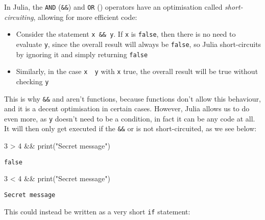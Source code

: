 \documentclass[
  letterpaper,
  DIV=11,
  numbers=noendperiod]{scrreprt}
\newenvironment{Shaded}{\begin{snugshade}}{\end{snugshade}}
\newcommand{\FloatTok}[1]{\textcolor[rgb]{0.68,0.00,0.00}{#1}}
\newcommand{\FunctionTok}[1]{\textcolor[rgb]{0.28,0.35,0.67}{#1}}
\newcommand{\NormalTok}[1]{\textcolor[rgb]{0.00,0.23,0.31}{#1}}
\newcommand{\OperatorTok}[1]{\textcolor[rgb]{0.37,0.37,0.37}{#1}}
\newcommand{\StringTok}[1]{\textcolor[rgb]{0.13,0.47,0.30}{#1}}
\begin{document}
In Julia, the \texttt{AND} (\texttt{\&\&}) and \texttt{OR}
(\texttt{\textbar{}\textbar{}}) operators have an optimisation called
\emph{short-circuiting}, allowing for more efficient code:

\begin{itemize}
\item
  Consider the statement \texttt{x\ \&\&\ y}. If \texttt{x} is
  \texttt{false}, then there is no need to evaluate \texttt{y}, since
  the overall result will always be \texttt{false}, so Julia
  short-circuits by ignoring it and simply returning \texttt{false}
\item
  Similarly, in the case \texttt{x\ \textbar{}\textbar{}\ y} with
  \texttt{x} true, the overall result will be true without checking
  \texttt{y}
\end{itemize}

This is why \texttt{\&\&} and \texttt{\textbar{}\textbar{}} aren't
functions, because functions don't allow this behaviour, and it is a
decent optimisation in certain cases. However, Julia allows us to do
even more, as \texttt{y} doesn't need to be a condition, in fact it can
be any code at all. It will then only get executed if the \texttt{\&\&}
or \texttt{\textbar{}\textbar{}} is not short-circuited, as we see
below:

\begin{Shaded}
\begin{Highlighting}[]
\FloatTok{3} \OperatorTok{\textgreater{}} \FloatTok{4} \OperatorTok{\&\&} \FunctionTok{print}\NormalTok{(}\StringTok{"Secret message"}\NormalTok{)}
\end{Highlighting}
\end{Shaded}

\begin{verbatim}
false
\end{verbatim}

\begin{Shaded}
\begin{Highlighting}[]
\FloatTok{3} \OperatorTok{\textless{}} \FloatTok{4} \OperatorTok{\&\&} \FunctionTok{print}\NormalTok{(}\StringTok{"Secret message"}\NormalTok{)}
\end{Highlighting}
\end{Shaded}

\begin{verbatim}
Secret message
\end{verbatim}

This could instead be written as a very short \texttt{if} statement:
\end{document}
